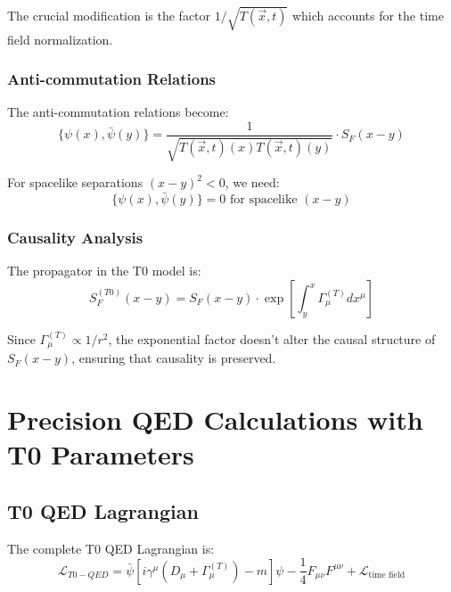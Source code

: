 \documentclass[12pt,a4paper]{article}
\newcommand{\Tfieldt}{T(\vec{x},t)}
\begin{document}
	The crucial modification is the factor $1/\sqrt{\Tfieldt}$ which accounts for the time field normalization.
	
	\subsubsection{Anti-commutation Relations}
	\label{subsubsec:anticommutation}
	
	The anti-commutation relations become:
	\begin{equation}
		\{\psi(x), \bar{\psi}(y)\} = \frac{1}{\sqrt{\Tfieldt(x)\Tfieldt(y)}} \cdot S_F(x-y)
		\label{eq:t0_anticommutation}
	\end{equation}
	
	For spacelike separations $(x-y)^2 < 0$, we need:
	\begin{equation}
		\{\psi(x), \bar{\psi}(y)\} = 0 \text{ for spacelike } (x-y)
		\label{eq:causality_condition}
	\end{equation}
	
	\subsubsection{Causality Analysis}
	\label{subsubsec:causality_analysis}
	
	The propagator in the T0 model is:
	\begin{equation}
		S_F^{(T0)}(x-y) = S_F(x-y) \cdot \exp\left[\int_y^x \Gamma_{\mu}^{(T)} dx^{\mu}\right]
		\label{eq:t0_propagator}
	\end{equation}
	
	Since $\Gamma_{\mu}^{(T)} \propto 1/r^2$, the exponential factor doesn't alter the causal structure of $S_F(x-y)$, ensuring that causality is preserved.
	
	\section{Precision QED Calculations with T0 Parameters}
	\label{sec:precision_qed_t0}
	
	\subsection{T0 QED Lagrangian}
	\label{subsec:t0_qed_lagrangian}
	
	The complete T0 QED Lagrangian is:
	\begin{equation}
		\mathcal{L}_{T0-QED} = \bar{\psi}[i\gamma^{\mu}(D_{\mu} + \Gamma_{\mu}^{(T)}) - m]\psi - \frac{1}{4}F_{\mu\nu}F^{\mu\nu} + \mathcal{L}_{\text{time field}}
		\label{eq:t0_qed_lagrangian}
	\end{equation}
	
\end{document}
